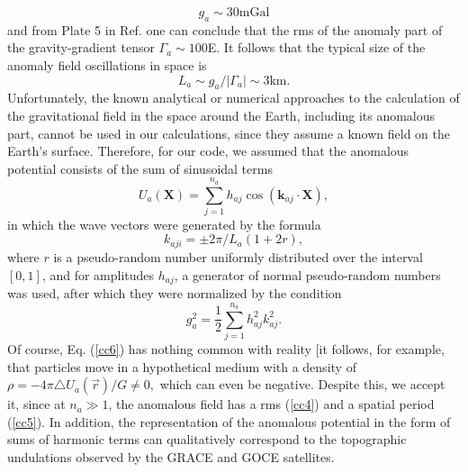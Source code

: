 \documentclass[twocolumn,showpacs,preprintnumbers]{revtex4}
\begin{document}
\begin{equation}
g_{a}\sim 30\text{mGal}  \label{cc4}
\end{equation}%
and from Plate 5 in Ref. \cite{c20} one can conclude that the rms of the
anomaly part of the gravity-gradient tensor $\Gamma _{a}\sim 100$E. It
follows that the typical size of the anomaly field oscillations in space is%
\begin{equation}
L_{a}\sim g_{a}/\left\vert \Gamma _{a}\right\vert \sim 3\text{km.}
\label{cc5}
\end{equation}%
Unfortunately, the known analytical \cite{c21} or numerical \cite{c21.1,c22}
approaches to the calculation of the gravitational field in the space around
the Earth, including its anomalous part, cannot be used in our calculations,
since they assume a known field on the Earth's surface. Therefore, for our
code, we assumed that the anomalous potential consists of the sum of
sinusoidal terms%
\begin{equation}
U_{a}\left( \mathbf{X}\right) =\sum_{j=1}^{n_{a}}h_{aj}\cos \left( \mathbf{k}%
_{aj}\cdot \mathbf{X}\right) ,  \label{cc6}
\end{equation}%
in which the wave vectors were generated by the formula%
\begin{equation}
k_{aji}=\pm 2\pi /L_{a}(1+2r),  \label{cc7}
\end{equation}%
where $r$ is a pseudo-random number uniformly distributed over the interval $%
\left[ 0,1\right] $, and for amplitudes $h_{aj}$, a generator of normal
pseudo-random numbers was used, after which they were normalized by the
condition%
\begin{equation}
g_{a}^{2}=\dfrac{1}{2}\sum_{j=1}^{n_{a}}h_{aj}^{2}k_{aj}^{2}.  \label{cc8}
\end{equation}%
Of course, Eq. (\ref{cc6}) has nothing common with reality [it follows, for
example, that particles move in a hypothetical medium with a density of $%
\rho =-4\pi \triangle U_{a}\left( \vec{r}\right) /G\not=0,$ which can even
be negative. Despite this, we accept it, since at $n_{a}\gg 1$, the
anomalous field has a rms (\ref{cc4}) and a spatial period (\ref{cc5}). In
addition, the representation of the anomalous potential in the form of sums
of harmonic terms can qualitatively correspond to the topographic
undulations observed by the GRACE and GOCE satellites.
\end{document}
